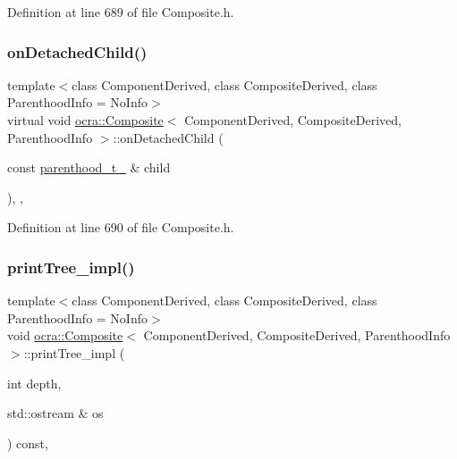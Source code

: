 Definition at line 689 of file Composite.\+h.

\hypertarget{classocra_1_1Composite_a94ec703ff5bf3c94f522648f117c8221}{}\label{classocra_1_1Composite_a94ec703ff5bf3c94f522648f117c8221} 
\subsubsection{\texorpdfstring{on\+Detached\+Child()}{onDetachedChild()}}
{\footnotesize\ttfamily template$<$class Component\+Derived, class Composite\+Derived, class Parenthood\+Info = No\+Info$>$ \\
virtual void \hyperlink{classocra_1_1Composite}{ocra\+::\+Composite}$<$ Component\+Derived, Composite\+Derived, Parenthood\+Info $>$\+::on\+Detached\+Child (\begin{DoxyParamCaption}\item[{const \hyperlink{classocra_1_1Parenthood}{parenthood\+\_\+t\+\_\+} \&}]{child }\end{DoxyParamCaption})\hspace{0.3cm}{\ttfamily [inline]}, {\ttfamily [protected]}, {\ttfamily [virtual]}}



Definition at line 690 of file Composite.\+h.

\hypertarget{classocra_1_1Composite_a99934c9b17849dd55075c4c773008dae}{}\label{classocra_1_1Composite_a99934c9b17849dd55075c4c773008dae} 
\subsubsection{\texorpdfstring{print\+Tree\+\_\+impl()}{printTree\_impl()}}
{\footnotesize\ttfamily template$<$class Component\+Derived, class Composite\+Derived, class Parenthood\+Info = No\+Info$>$ \\
void \hyperlink{classocra_1_1Composite}{ocra\+::\+Composite}$<$ Component\+Derived, Composite\+Derived, Parenthood\+Info $>$\+::print\+Tree\+\_\+impl (\begin{DoxyParamCaption}\item[{int}]{depth,  }\item[{std\+::ostream \&}]{os }\end{DoxyParamCaption}) const\hspace{0.3cm}{\ttfamily [inline]}, {\ttfamily [protected]}}



